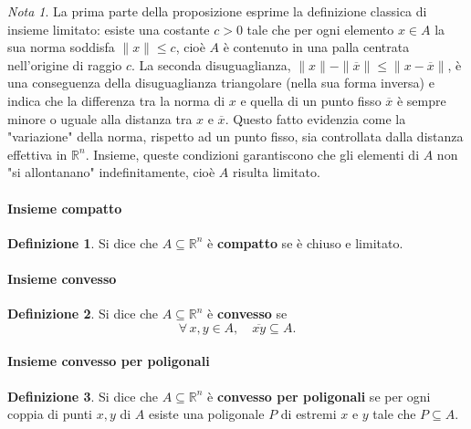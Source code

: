 \documentclass{article}
\theoremstyle{plain}
\theoremstyle{definition}
\newtheorem{defn}{Definizione}[section]
\theoremstyle{remark}
\newtheorem{note}{Nota}
\begin{document}
\vspace{10pt}

\begin{note}
    La prima parte della proposizione esprime la definizione classica di insieme limitato: esiste una costante $c>0$ tale che per ogni elemento $x\in A$ 
    la sua norma soddisfa $\|x\|\leq c$, cioè $A$ è contenuto in una palla centrata nell'origine di raggio $c$. La seconda disuguaglianza, 
    $\|x\|-\| \overline{x} \|\leq \| x-\overline{x} \|$, è una conseguenza della disuguaglianza triangolare (nella sua forma inversa) e indica che la 
    differenza tra la norma di $x$ e quella di un punto fisso $\overline{x}$ è sempre minore o uguale alla distanza tra $x$ e $\overline{x}$. 
    Questo fatto evidenzia come la "variazione" della norma, rispetto ad un punto fisso, sia controllata dalla distanza effettiva in $\mathbb{R}^n$. 
    Insieme, queste condizioni garantiscono che gli elementi di $A$ non "si allontanano" indefinitamente, cioè $A$ risulta limitato.
\end{note}

\vspace{10pt}

\paragraph{Insieme compatto}
\begin{bxthm}
\begin{defn}
    Si dice che $A\subseteq\mathbb{R}^n$ è \textbf{compatto} se è chiuso e limitato.
\end{defn}
\end{bxthm}

\vspace{10pt}

\paragraph{Insieme convesso}
\begin{bxthm}
\begin{defn}
    Si dice che $A\subseteq\mathbb{R}^n$ è \textbf{convesso} se 
    \[\forall\, x,y\in A,\quad \overline{xy}\subseteq A.\]
\end{defn}
\end{bxthm}

\vspace{10pt}

\paragraph{Insieme convesso per poligonali}
\begin{bxthm}
\begin{defn}
    Si dice che $A\subseteq\mathbb{R}^n$ è \textbf{convesso per poligonali} se per ogni coppia di punti $x,y$ di $A$ esiste 
    una poligonale $P$ di estremi $x$ e $y$ tale che $P\subseteq A$.
\end{defn}
\end{bxthm}
\end{document}
